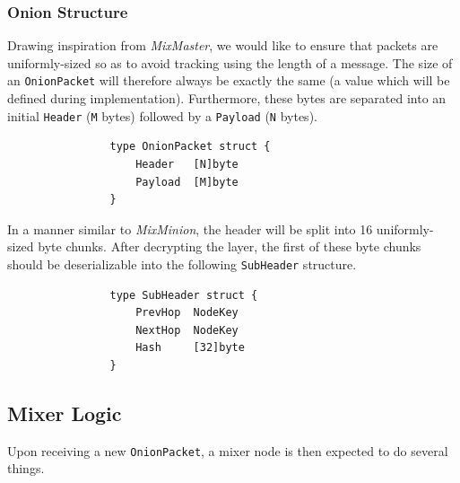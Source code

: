 \documentclass[11pt, a4paper]{article}
\begin{document}

        \subsubsection{Onion Structure}\label{subsec:onion-structure}

            Drawing inspiration from \textit{MixMaster}, we would like to ensure that packets are uniformly-sized so as to avoid tracking using the length of a message.
            The size of an \texttt{OnionPacket} will therefore always be exactly the same (a value which will be defined during implementation). Furthermore, these bytes are separated into an initial \texttt{Header} (\texttt{M} bytes) followed by a \texttt{Payload} (\texttt{N} bytes).

            \begin{lstlisting}
                type OnionPacket struct {
                    Header   [N]byte
                    Payload  [M]byte
                }
            \end{lstlisting}

            In a manner similar to \textit{MixMinion}, the header will be split into 16 uniformly-sized byte chunks.
            After decrypting the layer, the first of these byte chunks should be deserializable into the following \texttt{SubHeader} structure.

            \begin{lstlisting}
                type SubHeader struct {
                    PrevHop  NodeKey
                    NextHop  NodeKey
                    Hash     [32]byte
                }
            \end{lstlisting}

            \subsection{Mixer Logic}\label{subsec:mixer-logic}

            Upon receiving a new \texttt{OnionPacket}, a mixer node is then expected to do several things.
\end{document}

